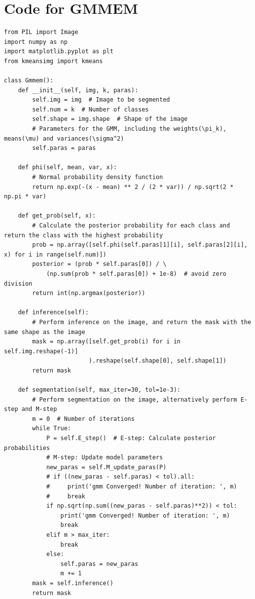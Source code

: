 \documentclass[UTF8]{ctexart}
\begin{document}
\newpage
\appendix
\hypertarget{code1}{\section{Code for GMMEM}}
\begin{lstlisting}
from PIL import Image
import numpy as np
import matplotlib.pyplot as plt
from kmeansimg import kmeans

class Gmmem():
    def __init__(self, img, k, paras):
        self.img = img  # Image to be segmented
        self.num = k  # Number of classes
        self.shape = img.shape  # Shape of the image
        # Parameters for the GMM, including the weights(\pi_k), means(\mu) and variances(\sigma^2)
        self.paras = paras

    def phi(self, mean, var, x):
        # Normal probability density function
        return np.exp(-(x - mean) ** 2 / (2 * var)) / np.sqrt(2 * np.pi * var)

    def get_prob(self, x):
        # Calculate the posterior probability for each class and return the class with the highest probability
        prob = np.array([self.phi(self.paras[1][i], self.paras[2][i], x) for i in range(self.num)])
        posterior = (prob * self.paras[0]) / \
            (np.sum(prob * self.paras[0]) + 1e-8)  # avoid zero division
        return int(np.argmax(posterior))

    def inference(self):
        # Perform inference on the image, and return the mask with the same shape as the image
        mask = np.array([self.get_prob(i) for i in self.img.reshape(-1)]
                        ).reshape(self.shape[0], self.shape[1])
        return mask

    def segmentation(self, max_iter=30, tol=1e-3):
        # Perform segmentation on the image, alternatively perform E-step and M-step
        m = 0  # Number of iterations
        while True:
            P = self.E_step()  # E-step: Calculate posterior probabilities
            # M-step: Update model parameters
            new_paras = self.M_update_paras(P)
            # if ((new_paras - self.paras) < tol).all:
            #     print('gmm Converged! Number of iteration: ', m)
            #     break
            if np.sqrt(np.sum((new_paras - self.paras)**2)) < tol:
                print('gmm Converged! Number of iteration: ', m)
                break
            elif m > max_iter:
                break
            else:
                self.paras = new_paras
                m += 1
        mask = self.inference()
        return mask


\end{lstlisting}
\end{document}
